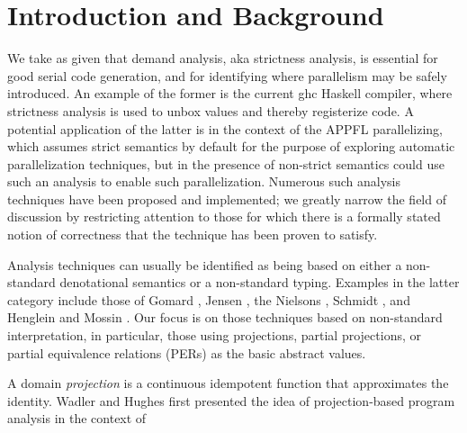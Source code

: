 \documentclass[11pt]{article}
\begin{document}


\section{Introduction and Background}

We take as given that demand analysis, aka strictness analysis, is essential
for good serial code generation, and for identifying where parallelism may be
safely introduced.  An example of the former is the current ghc Haskell
compiler, where strictness analysis is used to unbox values and thereby
registerize code.  A potential application of the latter is in the context of
the APPFL parallelizing, which assumes strict semantics by default for the
purpose of exploring automatic parallelization techniques, but in the presence
of non-strict semantics could use such an analysis to enable such
parallelization.  Numerous such analysis techniques have been proposed and
implemented; we greatly narrow the field of discussion by restricting
attention to those for which there is a formally stated notion of correctness
that the technique has been proven to satisfy.

Analysis techniques can usually be identified as being based on either a
non-standard denotational semantics or a non-standard typing.  Examples in the
latter category include those of Gomard \cite{Go92}, Jensen \cite{Jen92}, the
Nielsons \cite{NN88}, Schmidt \cite{Sch88}, and Henglein and Mossin
\cite{HM94}.  Our focus is on those techniques based on non-standard
interpretation, in particular, those using projections, partial projections, or
partial equivalence relations (PERs) as the basic abstract values.

A domain {\it projection\/} is a continuous idempotent function that
approximates the identity.  Wadler and Hughes first presented the idea of
projection-based program analysis in the context of 
\end{document}
